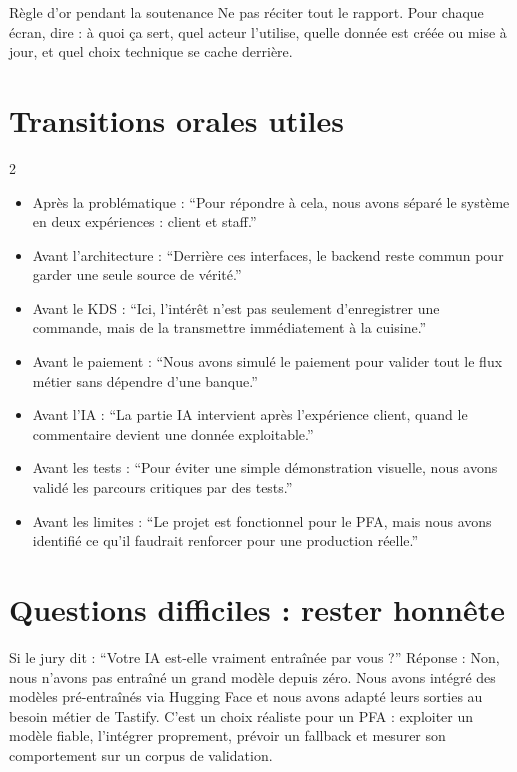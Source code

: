 \documentclass[10pt,a4paper]{article}
\begin{document}
\begin{phrasebox}{Règle d'or pendant la soutenance}
Ne pas réciter tout le rapport. Pour chaque écran, dire : à quoi ça sert, quel acteur l'utilise, quelle donnée est créée ou mise à jour, et quel choix technique se cache derrière.
\end{phrasebox}

\section{Transitions orales utiles}

\begin{multicols}{2}
\begin{itemize}
  \item Après la problématique : ``Pour répondre à cela, nous avons séparé le système en deux expériences : client et staff.''
  \item Avant l'architecture : ``Derrière ces interfaces, le backend reste commun pour garder une seule source de vérité.''
  \item Avant le KDS : ``Ici, l'intérêt n'est pas seulement d'enregistrer une commande, mais de la transmettre immédiatement à la cuisine.''
  \item Avant le paiement : ``Nous avons simulé le paiement pour valider tout le flux métier sans dépendre d'une banque.''
  \item Avant l'IA : ``La partie IA intervient après l'expérience client, quand le commentaire devient une donnée exploitable.''
  \item Avant les tests : ``Pour éviter une simple démonstration visuelle, nous avons validé les parcours critiques par des tests.''
  \item Avant les limites : ``Le projet est fonctionnel pour le PFA, mais nous avons identifié ce qu'il faudrait renforcer pour une production réelle.''
\end{itemize}
\end{multicols}

\section{Questions difficiles : rester honnête}

\begin{riskbox}{Si le jury dit : ``Votre IA est-elle vraiment entraînée par vous ?''}
Réponse : Non, nous n'avons pas entraîné un grand modèle depuis zéro. Nous avons intégré des modèles pré-entraînés via Hugging Face et nous avons adapté leurs sorties au besoin métier de Tastify. C'est un choix réaliste pour un PFA : exploiter un modèle fiable, l'intégrer proprement, prévoir un fallback et mesurer son comportement sur un corpus de validation.
\end{riskbox}
\end{document}
